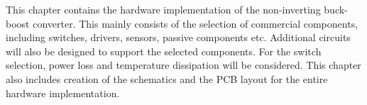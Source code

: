
This chapter contains the hardware implementation of the non-inverting buck-boost converter. This mainly consists of the selection of commercial components, including switches, drivers, sensors, passive components etc. Additional circuits will also be designed to support the selected components. For the switch selection, power loss and temperature dissipation will be considered. This chapter also includes creation of the schematics and the PCB layout for the entire hardware implementation. 